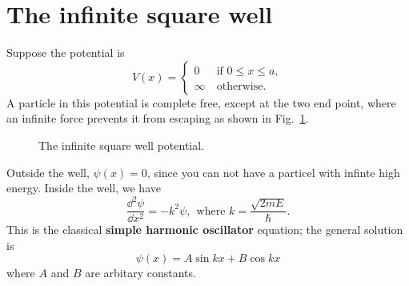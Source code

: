 \section{The infinite square well}
Suppose the potential is
\begin{equation}
  \label{eq:2-11}
  V \left( x \right) =
  \begin{cases}
    0 ~ & \text{if $0 \leq x \leq a$}, \\
    \infty  ~ & \text{otherwise}.
  \end{cases}
\end{equation}
A particle in this potential is complete free, except at the two end point, where an infinite force prevents it from escaping as shown in Fig.~\ref{fig:2-1}.
\begin{figure}[h]
  \centering
  \label{fig:2-1}
  \caption{The infinite square well potential.}
\end{figure}

Outside the well, $\psi \left( x \right)=0$, since you can not have a particel with infinte high energy.
Inside the well, we have
\begin{equation}
  \label{eq:2-12}
  \frac{\dd^{2} \psi}{\dd x^{2}}  = -k^{2} \psi, ~ ~  \text{where } k= \frac{\sqrt{2mE}}{\hbar}.
\end{equation}
This is the classical \textbf{simple harmonic oscillator} equation; the general solution is
\begin{equation}
  \label{eq:2-13}
  \psi \left( x \right) = A \sin kx + B \cos kx
\end{equation}
where $A$ and $B$ are arbitary constants.



